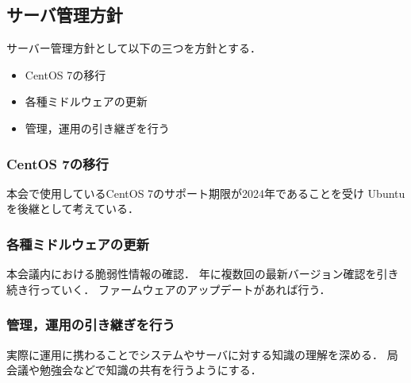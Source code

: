 \subsection*{サーバ管理方針}


サーバー管理方針として以下の三つを方針とする．
\begin{itemize}
    \item CentOS 7の移行
    \item 各種ミドルウェアの更新
    \item 管理，運用の引き継ぎを行う
\end{itemize}

\subsubsection*{CentOS 7の移行}
本会で使用しているCentOS 7のサポート期限が2024年であることを受け
Ubuntuを後継として考えている．


\subsubsection*{各種ミドルウェアの更新}
本会議内における脆弱性情報の確認．
年に複数回の最新バージョン確認を引き続き行っていく．
ファームウェアのアップデートがあれば行う．


\subsubsection*{管理，運用の引き継ぎを行う}
実際に運用に携わることでシステムやサーバに対する知識の理解を深める．
局会議や勉強会などで知識の共有を行うようにする．
